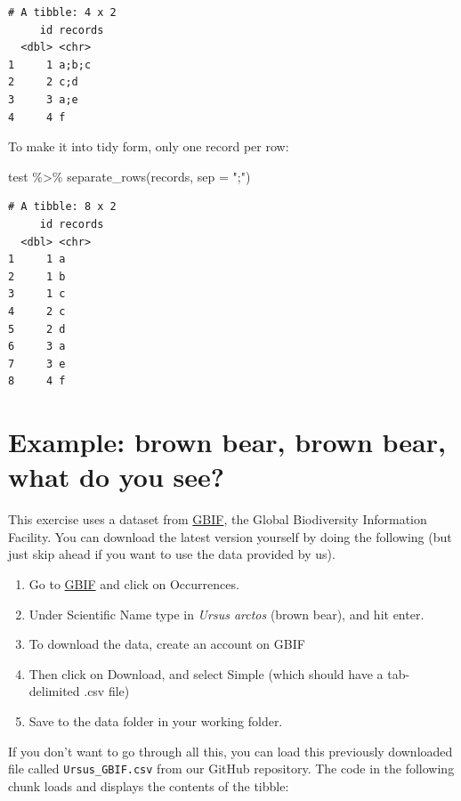 \documentclass[
  letterpaper,
  DIV=11,
  numbers=noendperiod]{scrreprt}
\newenvironment{Shaded}{\begin{snugshade}}{\end{snugshade}}
\newcommand{\AttributeTok}[1]{\textcolor[rgb]{0.40,0.45,0.13}{#1}}
\newcommand{\FunctionTok}[1]{\textcolor[rgb]{0.28,0.35,0.67}{#1}}
\newcommand{\NormalTok}[1]{\textcolor[rgb]{0.00,0.23,0.31}{#1}}
\newcommand{\SpecialCharTok}[1]{\textcolor[rgb]{0.37,0.37,0.37}{#1}}
\newcommand{\StringTok}[1]{\textcolor[rgb]{0.13,0.47,0.30}{#1}}
\providecommand{\tightlist}{%
  \setlength{\itemsep}{0pt}\setlength{\parskip}{0pt}}\usepackage{longtable,booktabs,array}
\begin{document}
\begin{verbatim}
# A tibble: 4 x 2
     id records
  <dbl> <chr>  
1     1 a;b;c  
2     2 c;d    
3     3 a;e    
4     4 f      
\end{verbatim}

To make it into tidy form, only one record per row:

\begin{Shaded}
\begin{Highlighting}[]
\NormalTok{test }\SpecialCharTok{\%\textgreater{}\%} \FunctionTok{separate\_rows}\NormalTok{(records, }\AttributeTok{sep =} \StringTok{";"}\NormalTok{)}
\end{Highlighting}
\end{Shaded}

\begin{verbatim}
# A tibble: 8 x 2
     id records
  <dbl> <chr>  
1     1 a      
2     1 b      
3     1 c      
4     2 c      
5     2 d      
6     3 a      
7     3 e      
8     4 f      
\end{verbatim}

\hypertarget{example-brown-bear-brown-bear-what-do-you-see}{%
\section{Example: brown bear, brown bear, what do you
see?}\label{example-brown-bear-brown-bear-what-do-you-see}}

This exercise uses a dataset from \href{https://www.gbif.org/en/}{GBIF},
the Global Biodiversity Information Facility. You can download the
latest version yourself by doing the following (but just skip ahead if
you want to use the data provided by us).

\begin{enumerate}
\def\labelenumi{\arabic{enumi}.}
\tightlist
\item
  Go to \href{https://www.gbif.org/en/}{GBIF} and click on Occurrences.
\item
  Under Scientific Name type in \emph{Ursus arctos} (brown bear), and
  hit enter.
\item
  To download the data, create an account on GBIF
\item
  Then click on Download, and select Simple (which should have a
  tab-delimited .csv file)
\item
  Save to the data folder in your working folder.
\end{enumerate}

If you don't want to go through all this, you can load this previously
downloaded file called \texttt{Ursus\_GBIF.csv} from our GitHub
repository. The code in the following chunk loads and displays the
contents of the tibble:
\end{document}
